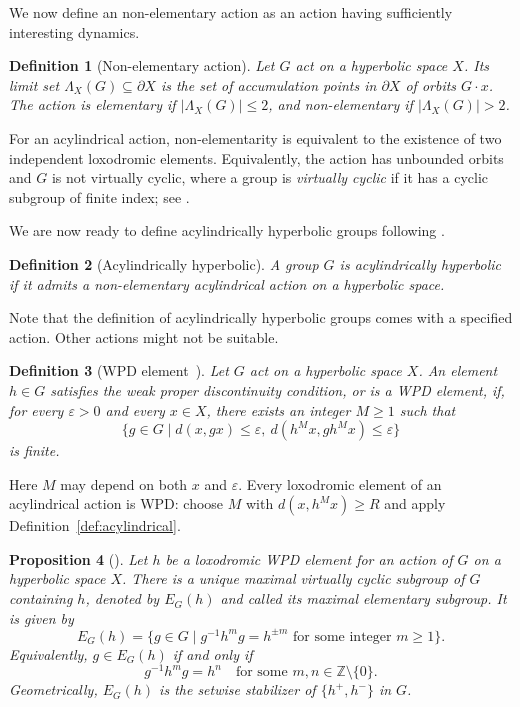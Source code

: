 \documentclass[10pt,a4paper]{amsart}
\newtheorem{prop}{Proposition}[section]
\newtheorem{definition}[prop]{Definition}
\newcommand{\ZZ}{\mathbb{Z}}
\begin{document}
We now define an non-elementary action as an action having sufficiently interesting dynamics.
\begin{definition}[Non-elementary action]
\label{def:elementary}
Let $G$ act on a hyperbolic space $X$.  Its \emph{limit set}
$\Lambda_X(G)\subseteq\partial X$ is the set of accumulation points in
$\partial X$ of orbits $G \cdot x$.
The action is \emph{elementary} if $|\Lambda_X(G)|\leq2$, and
\emph{non-elementary} if $|\Lambda_X(G)|>2$.
\end{definition}

For an acylindrical action, non-elementarity is equivalent to the existence
of two independent loxodromic elements.  Equivalently, the action has
unbounded orbits and $G$ is not virtually cyclic, where a group is
\emph{virtually cyclic} if it has a cyclic subgroup of finite index;
see \cite[Theorem~1.1]{OsinAcylindrical}. 

We are now ready to define acylindrically hyperbolic groups following \cite[Definition~1.3]{OsinAcylindrical}.
\begin{definition}[Acylindrically hyperbolic]
\label{def:AH}
A group $G$ is \emph{acylindrically hyperbolic} if it admits a
non-elementary acylindrical action on a hyperbolic space.
\end{definition}

Note that the definition of acylindrically hyperbolic groups comes with a specified action. Other actions might not be suitable.

\begin{definition}[WPD element~{\cite[Definition~6.1]{DGO}}]
\label{def:WPD}
Let $G$ act on a hyperbolic space $X$.  An element $h\in G$ satisfies the
\emph{weak proper discontinuity condition}, or is a \emph{WPD element},
if, for every $\varepsilon>0$ and every $x\in X$, there exists an integer
$M\geq1$ such that
\[
    \{g\in G\mid d(x,gx)\leq\varepsilon,
                  \ d(h^M x,gh^M x)\leq\varepsilon\}
\]
is finite.
\end{definition}

Here $M$ may depend on both $x$ and $\varepsilon$.  Every loxodromic element
of an acylindrical action is WPD: choose $M$ with $d(x,h^M x)\geq R$ and
apply Definition~\ref{def:acylindrical}. 

\begin{prop}[{\cite[Lemma~6.5 and Corollary~6.6]{DGO}}]
\label{prop:EG}
Let $h$ be a loxodromic WPD element for an action of $G$ on a hyperbolic
space $X$.  There is a unique maximal virtually cyclic subgroup of $G$
containing $h$, denoted by $E_G(h)$ and called its \emph{maximal elementary
subgroup}.  It is given by
\[
    E_G(h)=\{g\in G\mid
       g^{-1}h^m g=h^{\pm m}\text{ for some integer }m\geq1\}.
\]
Equivalently, $g\in E_G(h)$ if and only if
\[
    g^{-1}h^m g=h^n
    \quad\text{for some }m,n\in\ZZ\setminus\{0\}.
\]
Geometrically, $E_G(h)$ is the setwise stabilizer of
$\{h^+,h^-\}$ in $G$.
\end{prop}
\end{document}
